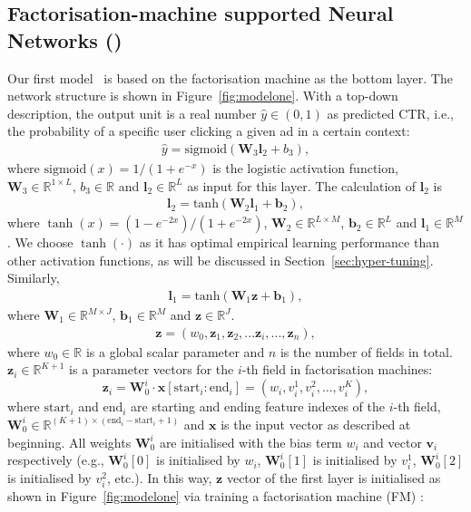 \documentclass{llncs}
\newcommand{\bs}{\boldsymbol}
\newcommand{\sigmoid}{\text{sigmoid}}
\newcommand{\tanhh}{\text{tanh}}
\newcommand{\tstart}{\text{start}}
\newcommand{\tend}{\text{end}}
\newcommand{\fmnn}{\text{FNN}}
\begin{document}
\subsection{Factorisation-machine supported Neural Networks (\fmnn)}\label{sec:fmnn}
Our first model \fmnn~is based on the factorisation machine as the bottom layer. The network structure is shown in Figure~\ref{fig:modelone}. With a top-down description, the output unit is a real number $\hat{y} \in (0,1)$ as predicted CTR, i.e., the probability of a specific user clicking a given ad in a certain context:
\begin{align}
\hat{y} =\sigmoid(\bs{W}_{3}\bs{l}_{2}+b_{3}),   \label{eq:xdef1}
\end{align}
where $\sigmoid (x)=1/(1+e^{-x})$ is the logistic activation function, $\bs{W}_{3}\in\mathbb{R}^{1 \times L}$, $b_{3}\in \mathbb{R}$  and $\bs{l}_{2} \in \mathbb{R}^{L}$ as input for this layer. The calculation of $\bs{l}_{2}$ is
\begin{align}
\bs{l}_{2}=\tanhh(\bs{W}_{2}\bs{l}_{1}+\bs{b}_{2}),   \label{eq:xdef2}
\end{align}
where $\tanh(x)=(1-e^{-2x})/(1+e^{-2x})$, $\bs{W}_{2}\in\mathbb{R}^{L\times M}$, $\bs{b}_{2}\in \mathbb{R}^{L}$ and $\bs{l}_{1} \in \mathbb{R}^{M}$. We choose $\tanh(\cdot)$ as it has optimal empirical learning performance than other activation functions, as will be discussed in Section~\ref{sec:hyper-tuning}. Similarly,
\begin{align}
\bs{l}_{1}=\tanhh(\bs{W}_{1}\bs{z}+\bs{b}_{1}),   \label{eq:xdef3}
\end{align}
where $\bs{W}_{1}\in\mathbb{R}^{M\times J}$, $\bs{b}_{1}\in \mathbb{R}^{M}$ and $\bs{z} \in \mathbb{R}^{J}$.
\begin{align}
\bs{z}=(w_{0}, \bs{z}_{1}, \bs{z}_{2}, ...\bs{z}_{i}, ..., \bs{z}_{n}),
 \label{eq:xdef4}
\end{align}
where $w_{0} \in \mathbb{R}$ is a global scalar parameter and $n$ is the number of fields in total. $\bs{z}_{i} \in\mathbb{R}^{K+1}$ is a parameter vectors for the $i$-th field in factorisation machines:
\begin{equation}
\bs{z}_{i}=\bs{W}_{0}^{i}\cdot \bs{x}[\tstart_{i}:\tend_{i}] = (w_i, v_i^1, v_i^2, \ldots, v_i^K),
 \label{eq:xdef5}
\end{equation}
where $\tstart_{i}$ and $\tend_{i}$ are starting and ending feature indexes of the $i$-th field, $\bs{W}_{0}^{i} \in \mathbb{R}^{(K+1) \times (\tend_{i}-\tstart_{i}+1)} $ and $\bs{x}$ is the input vector as described at beginning. All weights $\bs{W}_{0}^{i}$ are initialised with the bias term $w_{i}$ and vector $\bs{v}_{i}$ respectively (e.g., $\bs{W}_{0}^{i}[0]$ is initialised by $w_{i}$, $\bs{W}_{0}^{i}[1]$ is initialised by $v_{i}^{1}$, $\bs{W}_{0}^{i}[2]$ is initialised by $v_{i}^{2}$, etc.). In this way, $\bs{z}$ vector of the first layer is initialised as shown in Figure~\ref{fig:modelone} via training a factorisation machine (FM) \cite{rendle2012factorization}:
\end{document}
